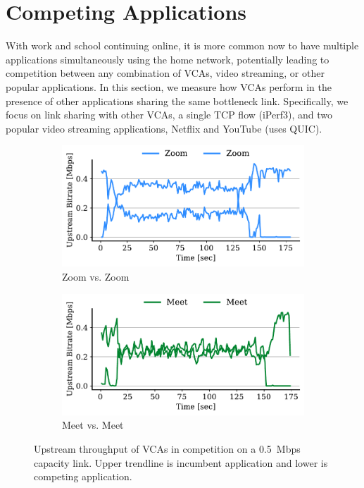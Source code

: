 \section{Competing Applications}
\label{sec:competition}
With work and school continuing online, it is more common now to have multiple applications simultaneously using the home network, potentially leading to competition between any combination of VCAs, video streaming, or other popular applications. In this section, we measure how VCAs perform in the presence of other applications sharing the same bottleneck link. Specifically, we focus on link sharing with other VCAs, a single TCP flow (iPerf3), and two popular video streaming applications, Netflix and YouTube (uses QUIC). 


\begin{figure}[t!]
\centering
\begin{subfigure}[t]{.4\textwidth}
    \centering
    \includegraphics[width=1\textwidth]{figures/comp_ts/zoom_zoom_0.5_ul_r2.pdf}
    \caption{Zoom vs. Zoom}
    \label{subfig:zoom_zoom_0_5}
\end{subfigure}\hfill
\begin{subfigure}[t]{.4\textwidth}
    \centering
    \includegraphics[width=1\textwidth]{figures/comp/meet_meet_0.5_ul_r1.pdf}
    \caption{Meet vs. Meet}
    \label{subfig:meet_meet_0_5}
\end{subfigure}
\caption{Upstream throughput of VCAs in competition on a 0.5~Mbps capacity link. Upper trendline is incumbent application and lower is competing application.}
\label{fig:meet-zoom-upld-0.5}
\end{figure}

